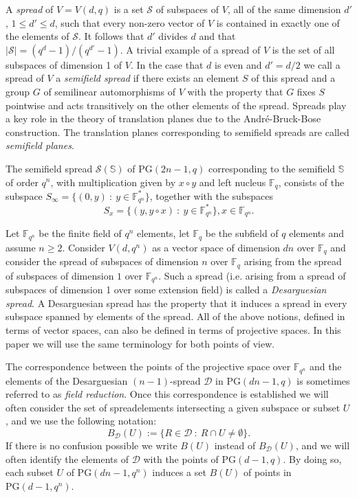 \documentclass[12pt]{amsart}
\def\F{\mathbb{F}}
\def\PG{\mathrm{PG}}
\def\S{\mathbb{S}}
\def\D{\mathcal{D}}
\begin{document}
A {\it spread} of $V=V(d,q)$ is a set $\mathcal S$ of subspaces of $V$, all of the same dimension $d'$, $1\leq d' \leq d$, such that every non-zero vector of $V$ is contained in exactly one of the elements of $\mathcal S$. It follows that $d'$ divides $d$ and that $|{\mathcal S}|=(q^d-1)/(q^{d'}-1)$. A trivial example of a spread of $V$ is the set of all subspaces of dimension 1 of $V$. In the case that $d$ is even and $d'=d/2$ we call a spread of $V$ a {\it semifield spread} if there exists an element $S$ of this spread and a group $G$ of semilinear automorphisms of $V$ with the property that $G$ fixes $S$ pointwise and acts transitively on the other elements of the spread. Spreads play a key role in the theory of translation planes due to the Andr{\'e}-Bruck-Bose construction. The translation planes corresponding to semifield spreads are called {\it semifield planes}.

The semifield spread $\mathcal S(\S)$ of $\PG(2n-1,q)$ corresponding to the semifield $\S$ of order $q^n$, with multiplication given by $x\circ y$ and left nucleus $\F_q$, consists of the subspace $S_\infty=\{(0,y)~:~ y \in \F_{q^n}^*\}$, together with the subspaces
$$
S_x=\{(y,y\circ x)~:~y \in \F_{q^n}^*\}, x \in \F_{q^n}.
$$


Let ${\mathbb F}_{q^n}$ be the finite field of $q^n$ elements, let ${\mathbb F}_q$ be the subfield of $q$ elements and assume $n\geq 2$. Consider $V(d,q^n)$ as a vector space of dimension $dn$ over ${\mathbb F}_q$ and consider the spread of subspaces of dimension $n$ over ${\mathbb F}_q$ arising from the spread of subspaces of dimension $1$ over ${\mathbb F}_{q^n}$. Such a spread (i.e. arising from a spread of subspaces of  dimension 1 over some extension field) is called a {\it Desarguesian spread}. A Desarguesian spread has the property that it induces a spread in every subspace spanned by elements of the spread.
All of the above notions, defined in terms of vector spaces, can also be defined in terms of projective spaces. In this paper we will use the same terminology for both points of view.

The correspondence between the points of the projective space over $\F_{q^n}$ and the elements of the Desarguesian $(n-1)$-spread $\D$ in $\PG(dn-1,q)$ is sometimes referred to as {\it field reduction}. Once this correspondence is established we will often consider the set of spreadelements intersecting a given subspace or subset $U$, and we use the following notation:
$$
B_\D(U):=\{R\in \D ~:~ R\cap U \neq \emptyset\}.
$$
If there is no confusion possible we write $B(U)$ instead of $B_\D(U)$, and we will often identify the elements of $\D$ with the points of $\PG(d-1,q)$. By doing so, each subset $U$ of $\PG(dn-1,q^n)$ induces a set $B(U)$ of points in $\PG(d-1,q^n)$. 
\end{document}
